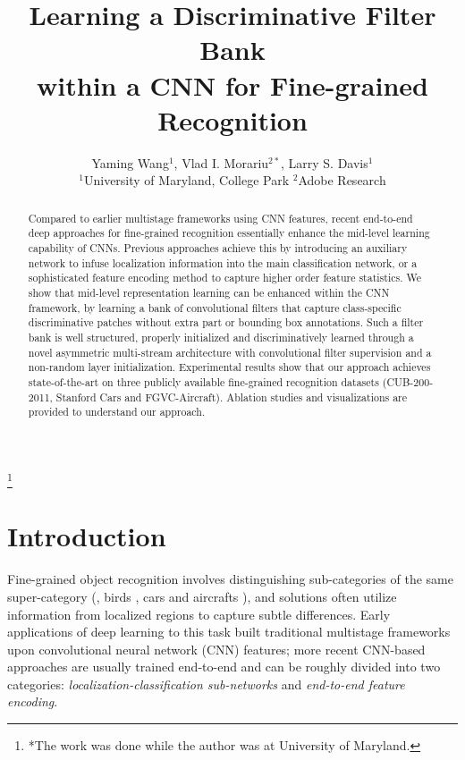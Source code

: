 \documentclass[10pt,twocolumn,letterpaper]{article}
\begin{document}
\title{Learning a Discriminative Filter Bank\\within a CNN for Fine-grained Recognition}

\author{Yaming Wang$^{1}$, \; Vlad I. Morariu$^{2*}$, \; Larry S. Davis$^1$\\
$^1$University of Maryland, College Park \quad $^2$Adobe Research\\
\quad\quad{} \quad\quad{}
}

\maketitle
\thispagestyle{empty}
\let\thefootnote\relax\footnote{*The work was done while the author was at University of Maryland.}
\begin{abstract}
Compared to earlier multistage frameworks using CNN features, recent end-to-end deep approaches for
fine-grained recognition essentially enhance the mid-level learning capability of CNNs. Previous approaches achieve
this by introducing an auxiliary network to infuse localization information into the main classification network, or
a sophisticated feature encoding method to capture higher order feature statistics. We show that mid-level
representation learning can be enhanced within the CNN framework, by learning a bank of convolutional
filters that capture class-specific discriminative patches without extra part or bounding box annotations. Such a filter
bank is well structured, properly initialized and discriminatively learned through a novel asymmetric multi-stream
architecture with convolutional filter supervision and a non-random layer initialization. 
Experimental results show that our approach achieves state-of-the-art on three publicly available fine-grained recognition datasets
(CUB-200-2011, Stanford Cars and FGVC-Aircraft). Ablation studies and visualizations are provided
to understand our approach.
\end{abstract}

\section{Introduction} \label{sec1}
Fine-grained object recognition involves distinguishing sub-categories of the same super-category
(\eg, birds \cite{cub2011}, cars \cite{car196} and aircrafts \cite{fgvc_air}),
and solutions often utilize information from localized regions to capture subtle differences. Early
applications of deep learning to this task built traditional multistage frameworks upon convolutional neural network
(CNN) features; more recent CNN-based approaches are usually trained end-to-end and can be roughly divided into two
categories: \textit{localization-classification sub-networks} and
\textit{end-to-end feature encoding}.
\end{document}
